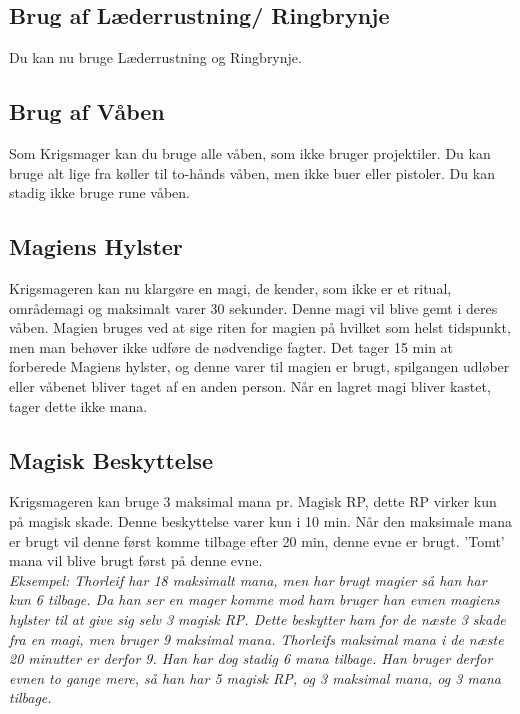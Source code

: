 \subsection*{Brug af Læderrustning/ Ringbrynje}
Du kan nu bruge Læderrustning og Ringbrynje.

\subsection*{Brug af Våben}
Som Krigsmager kan du bruge alle våben, som ikke bruger projektiler. Du kan bruge alt lige fra køller til to-hånds våben, men ikke buer eller pistoler. Du kan stadig ikke bruge rune våben.





\subsection*{Magiens Hylster}
Krigsmageren kan nu klargøre en magi, de kender, som ikke er et ritual, områdemagi og maksimalt varer 30 sekunder. Denne magi vil blive gemt i deres våben. Magien bruges ved at sige riten for magien på hvilket som helst tidspunkt, men man behøver ikke udføre de nødvendige fagter. Det tager 15 min at forberede Magiens hylster, og denne varer til magien er brugt, spilgangen udløber eller våbenet bliver taget af en anden person. Når en lagret magi bliver kastet, tager dette ikke mana.


\subsection*{Magisk Beskyttelse}
Krigsmageren kan bruge 3 maksimal mana pr. Magisk RP, dette RP virker kun på magisk skade. Denne beskyttelse varer kun i 10 min. Når den maksimale mana er brugt vil denne først komme tilbage efter 20 min, denne evne er brugt. 'Tomt' mana vil blive brugt først på denne evne.\\
\textit{Eksempel: Thorleif har 18 maksimalt mana, men har brugt magier så han har kun 6 tilbage. Da han ser en mager komme mod ham bruger han evnen magiens hylster til at give sig selv 3 magisk RP. Dette beskytter ham for de næste 3 skade fra en magi, men bruger 9 maksimal mana. Thorleifs maksimal mana i de næste 20 minutter er derfor 9. Han har dog stadig 6 mana tilbage. Han bruger derfor evnen to gange mere, så han har 5 magisk RP, og 3 maksimal mana, og 3 mana tilbage.}
